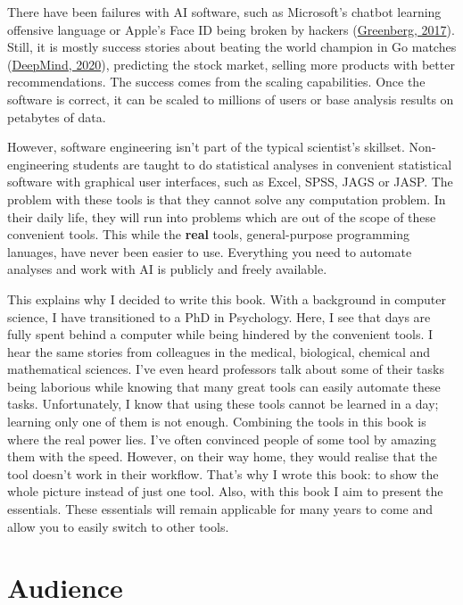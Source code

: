 \documentclass[
  14pt
  american,
  paper=a4,
  ,captions=tableheading
]{scrbook}
\begin{document}
There have been failures with AI software, such as Microsoft's chatbot
learning offensive language or Apple's Face ID being broken by hackers
(\protect\hyperlink{ref-greenberg2017hackers}{Greenberg, 2017}). Still,
it is mostly success stories about beating the world champion in Go
matches (\protect\hyperlink{ref-deepmind2020alphago}{DeepMind, 2020}),
predicting the stock market, selling more products with better
recommendations. The success comes from the scaling capabilities. Once
the software is correct, it can be scaled to millions of users or base
analysis results on petabytes of data.

However, software engineering isn't part of the typical scientist's
skillset. Non-engineering students are taught to do statistical analyses
in convenient statistical software with graphical user interfaces, such
as Excel, SPSS, JAGS or JASP. The problem with these tools is that they
cannot solve any computation problem. In their daily life, they will run
into problems which are out of the scope of these convenient tools. This
while the \textbf{real} tools, general-purpose programming lanuages,
have never been easier to use. Everything you need to automate analyses
and work with AI is publicly and freely available.

This explains why I decided to write this book. With a background in
computer science, I have transitioned to a PhD in Psychology. Here, I
see that days are fully spent behind a computer while being hindered by
the convenient tools. I hear the same stories from colleagues in the
medical, biological, chemical and mathematical sciences. I've even heard
professors talk about some of their tasks being laborious while knowing
that many great tools can easily automate these tasks. Unfortunately, I
know that using these tools cannot be learned in a day; learning only
one of them is not enough. Combining the tools in this book is where the
real power lies. I've often convinced people of some tool by amazing
them with the speed. However, on their way home, they would realise that
the tool doesn't work in their workflow. That's why I wrote this book:
to show the whole picture instead of just one tool. Also, with this book
I aim to present the essentials. These essentials will remain applicable
for many years to come and allow you to easily switch to other tools.

\hypertarget{audience}{%
\section{Audience}\label{audience}}
\end{document}
